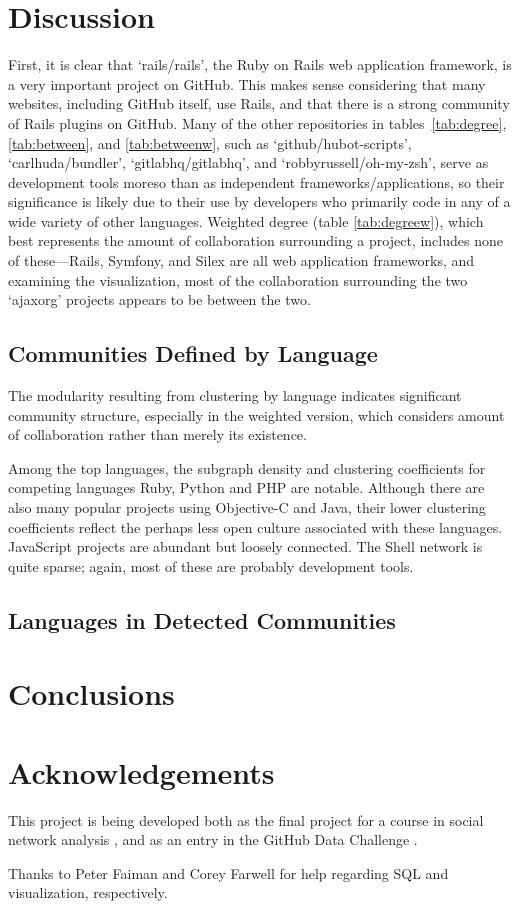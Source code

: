 \documentclass[11pt]{article}
\begin{document}
\section{Discussion}
First, it is clear that `rails/rails', the Ruby on Rails web application
framework, is a very important project on GitHub. This makes sense considering
that many websites, including GitHub itself, use Rails, and that there is a
strong community of Rails plugins on GitHub.  Many of the other repositories in
tables~\ref{tab:degree}, \ref{tab:between}, and \ref{tab:betweenw}, such as
`github/hubot-scripts', `carlhuda/bundler', `gitlabhq/gitlabhq', and
`robbyrussell/oh-my-zsh', serve as development tools moreso than as independent
frameworks/applications, so their significance is likely due to their use by
developers who primarily code in any of a wide variety of other languages.
Weighted degree (table \ref{tab:degreew}), which best represents the amount of
collaboration surrounding a project, includes none of these---Rails, Symfony,
and Silex are all web application frameworks, and examining the visualization,
most of the collaboration surrounding the two `ajaxorg' projects appears to be
between the two.

\subsection{Communities Defined by Language}
The modularity resulting from clustering by language indicates significant
community structure, especially in the weighted version, which considers amount
of collaboration rather than merely its existence.

Among the top languages, the subgraph density and clustering coefficients for
competing languages Ruby, Python and PHP are notable. Although there are also
many popular projects using Objective-C and Java, their lower clustering
coefficients reflect the perhaps less open culture associated with these
languages. JavaScript projects are abundant but loosely connected. The Shell
network is quite sparse; again, most of these are probably development tools. 

\subsection{Languages in Detected Communities}

\section{Conclusions}

\section{Acknowledgements}
This project is being developed both as the final project for a course in social
network analysis \cite{snacourse}, and as an entry in the GitHub Data Challenge
\cite{doll13}.

Thanks to Peter Faiman and Corey Farwell for help regarding SQL and
visualization, respectively.



\end{document}
